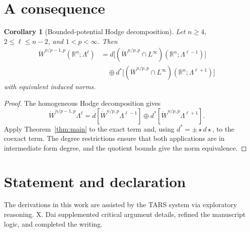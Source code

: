 \documentclass[11pt]{amsart}
\numberwithin{equation}{section}
\newtheorem{corollary}[theorem]{Corollary}
\theoremstyle{definition}
\theoremstyle{remark}
\newcommand{\R}{\mathbb R}
\begin{document}
\section{A consequence}\label{sec:consequences}

\begin{corollary}[Bounded-potential Hodge decomposition]\label{cor:bounded-hodge}
Let $n\ge4$, $2\le\ell\le n-2$, and $1<p<\infty$.  Then
\begin{equation}\label{eq:bounded-hodge}
\begin{aligned}
 \dot W^{n/p-1,p}(\R^n;\Lambda^\ell)
 &={}d\bigl[(\dot W^{n/p,p}\cap L^\infty)(\R^n;\Lambda^{\ell-1})\bigr]\\
 &\quad\oplus
 d^*\bigl[(\dot W^{n/p,p}\cap L^\infty)(\R^n;\Lambda^{\ell+1})\bigr]
\end{aligned}
\end{equation}
with equivalent induced norms.
\end{corollary}

\begin{proof}
The homogeneous Hodge decomposition gives
\[
 \dot W^{n/p-1,p}\Lambda^\ell
 =d[\dot W^{n/p,p}\Lambda^{\ell-1}]
 \oplus d^*[\dot W^{n/p,p}\Lambda^{\ell+1}].
\]
Apply Theorem~\ref{thm:main} to the exact term and, using
$d^*=\pm\star d\star$, to the coexact term.  The degree restrictions ensure
that both applications are in intermediate form degree, and the quotient
bounds give the norm equivalence.
\end{proof}

\section*{Statement and declaration}
The derivations in this work are assisted by the TARS system via exploratory reasoning. X. Dai supplemented critical argument details, refined the manuscript logic, and completed the writing.
\end{document}
